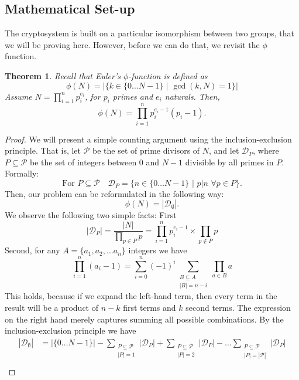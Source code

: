 \documentclass{article}
\newtheorem{theorem}{Theorem}[section]
\theoremstyle{definition}
\newcommand{\D}{\mathcal{D}}
\renewcommand{\P}{\mathcal{P}}
\begin{document}
\subsection{Mathematical Set-up}
The cryptosystem is built on a particular isomorphism between two groups, that
we will be proving here. However, before we can do that, we revisit the $\phi$
function.
\begin{theorem}
  \label{thm:phiformula}
  Recall that Euler's $\phi$-function is defined as
  \[
    \phi(N) = |\{k \in \{0\hdots N - 1\} \,\,|\,\, \gcd(k, N) = 1\}|
  \]
  Assume $N = \prod_{i = 1}^n p_i^{e_i}$, for $p_i$ primes and $e_i$ naturals. Then,
  \[
    \phi(N) = \prod_{i = 1}^n p_i^{e_i - 1} (p_i - 1).
  \]
\end{theorem}
\begin{proof}
  We will present a simple counting argument using the inclusion-exclusion
  principle. That is, let $\P$ be the set of prime divisors of $N$, and
  let $\D_P$, where $P \subseteq \P$ be the set of integers
  between $0$ and $N - 1$ divisible by all primes in $P$. Formally:
  \[
    \text{For } P \subseteq \P \quad \D_P = \{n \in \{0 \hdots
    N - 1\}\,\,|\,\,p | n\,\,\forall p \in P\}.
  \]
  Then, our problem can be reformulated in the following way:
  \[
    \phi(N) = |\D_\emptyset|.
  \]
  We observe the following two simple facts: First
  \[
    |\D_P| = \frac{|N|}{\prod_{p \in P}p} = \prod_{i = 1}^n p_i^{e_i -
      1} \times \prod_{p \not\in P}p
  \]
  Second, for any $A = \{a_1, a_2, \hdots a_n\}$ integers we have
  \begin{equation}
    \label{eq:prodexpansion}
    \prod_{i = 1}^n (a_i - 1) = \sum_{i = 0}^n (-1)^i
 \sum_{\substack{B \subseteq A \\ |B| = n - i}} \prod_{a \in B}a
  \end{equation}
  This holds, because if we expand the left-hand term, then every term in the
  result will be a product of $n - k$ first terms and $k$ second terms. The
  expression on the right hand merely captures summing all possible combinations.
  By the inclusion-exclusion principle we have
  \begin{align*}
    |\D_\emptyset| &= |\{0 \hdots N-1\}| - \sum_{\substack{P \subseteq \P \\ |P| =
        1}} |\D_P| + \sum_{\substack{P \subseteq \P \\ |P| =
        2}} |\D_P| - \hdots \sum_{\substack{P \subseteq \P \\ |P| =
    |\P|}} |\D_P| \\

\end{align*}
\end{proof}
\end{document}
